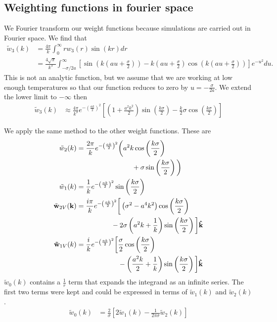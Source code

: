 \documentclass[letterpaper,twocolumn,amsmath,amssymb,prb]{revtex4-1}
\newcommand{\kk}{\textbf{k}}
\begin{document}
\subsection{Weighting functions in fourier space}

We Fourier transform our weight functions because simulations are
carried out in Fourier space.  We find that
\begin{align}
  \tilde{w}_3(k) &= \frac{4\pi}{k} \int_0^\infty r w_3(r) \sin(kr) dr \\ 
  &= \frac{4\sqrt{\pi}}{k^3}\int_{-\sigma/2a}^\infty \left[
    \sin(k(au+\frac{\sigma}{2})) - k(au + \frac{\sigma}{2})
    \cos(k(au+\frac{\sigma}{2}))\right] e^{-u^2} du.
\end{align}
This is not an analytic function, but we assume that we are working at
low enough temperatures so that our function reduces to zero by $u=
-\frac{\sigma}{2a}$. We extend the lower limit to $-\infty$ then
\begin{align}
  \tilde{w}_3(k) &\approx
  \frac{4\pi}{k^3}e^{-\left(\frac{ak}{2}\right)^2}\left[ \left(1 +
    \frac{a^2k^2}{2} \right) \sin\left(\frac{k\sigma}{2}\right) -
    \frac{k}{2} \sigma\cos\left(\frac{k \sigma}{2}\right) \right]
\end{align}

We apply the same method to the other weight functions. These are
\begin{align}
  \tilde{w}_2(k) &=\frac{2\pi}{k} e^{-\left(\frac{ak}{2} \right)^2}
  \bigg(a^2 k \cos\left(\frac{k\sigma}{2}\right) \notag \\
  & \hspace{8em}+\sigma \sin\left(\frac{k\sigma}{2}\right) \bigg) \\ 
  \tilde{w}_1(k) &=
  \frac{1}{k}e^{-\left(\frac{ak}{2} \right)^2}
  \sin\left(\frac{k\sigma}{2}\right) \\
  \tilde{\mathbf{w}}_{2V}(\kk) &=
  \frac{i \pi}{k} e^{-\left(\frac{ak}{2} \right)^2}\bigg[ \left(\sigma^2 - a^4k^2\right)
    \cos\left(\frac{k\sigma}{2}\right) \notag\\ 
    & \hspace{5em}- 2\sigma \left(a^2k + \frac{1}{k}
    \right)\sin\left(\frac{k\sigma}{2}\right) \bigg]
  \mathbf{\hat{k}} \\ 
  \mathbf{\tilde{w}}_{1V}(k)&= \frac{i}{k}
   e^{-\left(\frac{ak}{2} \right)^2} \bigg[ \frac{\sigma}{2}
    \cos\left(\frac{k\sigma}{2}\right) \notag\\
    & \hspace{6em}- \left( \frac{a^2k}{2} +
    \frac{1}{k} \right) \sin\left(\frac{k\sigma}{2}\right) \bigg]
  \mathbf{\hat{k}}
\end{align}
$\tilde{w}_0(k)$ contains a $\frac{1}{r}$ term that expands the
integrand  as an infinite series. The first two terms were kept and
could be expressed in terms of $\tilde{w}_1(k)$ and
$\tilde{w}_2(k)$.
\begin{align}
  \tilde{w}_0(k) &= \frac{2}{\sigma} \left[2\tilde{w}_1(k) - \frac{1}{2 \pi
      \sigma}\tilde{w}_2(k) \right]
\end{align}
\end{document}
